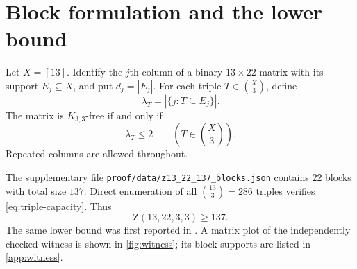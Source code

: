 \documentclass[10pt,a4paper]{amsart}
\newcommand{\Z}{\mathrm Z}
\begin{document}
\section{Block formulation and the lower bound}
Let $X=[13]$. Identify the $j$th column of a binary $13\times22$ matrix with its support $E_j\subseteq X$, and put $d_j=|E_j|$. For each triple $T\in\binom{X}{3}$, define
\[
  \lambda_T=|\{j:T\subseteq E_j\}|.
\]
The matrix is $K_{3,3}$-free if and only if
\begin{equation}\label{eq:triple-capacity}
  \lambda_T\le2 \qquad(T\in\binom{X}{3}).
\end{equation}
Repeated columns are allowed throughout.

The supplementary file \texttt{proof/data/z13\_22\_137\_blocks.json} contains $22$ blocks with total size $137$. Direct enumeration of all $\binom{13}{3}=286$ triples verifies \eqref{eq:triple-capacity}. Thus
\begin{equation}\label{eq:lower}
  \Z(13,22,3,3)\ge137.
\end{equation}
The same lower bound was first reported in \cite{BhanNobiliLanger2026}. A matrix plot of the independently checked witness is shown in \cref{fig:witness}; its block supports are listed in \cref{app:witness}.
\end{document}
